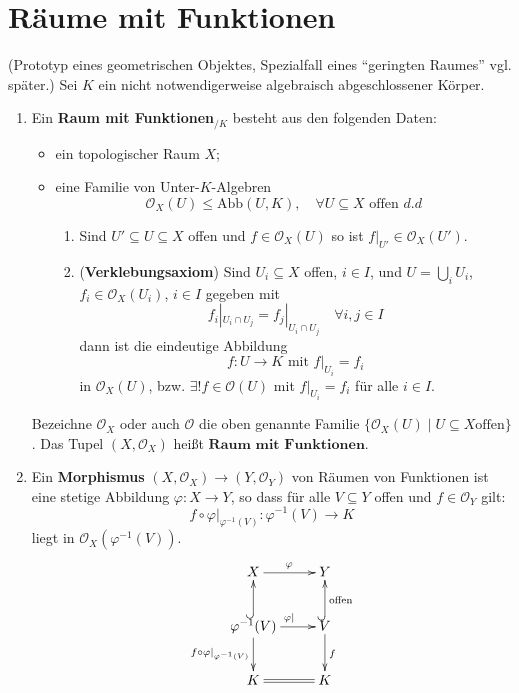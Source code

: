 
\section{Räume mit Funktionen}
\label{sec:raeume-mit-funktionen}
(Prototyp eines geometrischen Objektes, Spezialfall eines ``geringten
Raumes'' vgl. später.) Sei $K$ ein nicht notwendigerweise algebraisch abgeschlossener
Körper.
\begin{defn}
  \label{def:raum-mit-funktionen}
  \mbox{}
  \begin{enumerate}
  \item Ein \textbf{Raum mit Funktionen}$_{/K}$ besteht
    aus den folgenden Daten:
    \begin{itemize}
    \item ein topologischer Raum $X$;
    \item eine Familie von Unter-$K$-Algebren
      \[
        \mathcal{O}_X(U)\leq\text{Abb}(U,K),\quad\forall U\subseteq X\text{ offen }d.d
      \]

      \begin{enumerate}
      \item Sind $U'\subseteq U\subseteq X$ offen und $f\in\mathcal{O}_X(U)$ so ist
        $f|_{U'}\in \mathcal{O}_X(U')$.
      \item (\textbf{Verklebungsaxiom}) Sind $U_{i}\subseteq X$
        offen, $i\in I$, und $U=\bigcup_{i}U_{i}$, $f_{i}\in\mathcal{O}_X(U_{i})$,
        $i\in I$ gegeben mit
        \[
          f_{i}|_{U_{i}\cap U_{j}}=f_{j}|_{U_{i}\cap U_{j}}\quad\forall i,j\in I
        \]
        dann ist die eindeutige Abbildung
        \[
          f:U\rightarrow K\text{ mit }f|_{U_{i}}=f_{i}
        \]
        in $\mathcal{O}_X(U)$, bzw. $\exists!f\in\mathcal{O}(U)$ mit $f|_{U_{i}}=f_{i}$ für alle $i \in I$.
      \end{enumerate}
    \end{itemize}
    Bezeichne $\mathcal{O}_X$ oder auch $\mathcal{O}$ die oben genannte
    Familie $\{\mathcal{O}_X(U) \mid U \subseteq X \text{offen}\}$. Das Tupel $(X,\mathcal{O}_{X})$ heißt $\textbf{Raum mit Funktionen}$.
  \item Ein \textbf{Morphismus} $(X,\mathcal{O}_{X})\rightarrow(Y,\mathcal{O}_{Y})$
    von Räumen von Funktionen ist eine stetige Abbildung $\varphi:X\rightarrow Y$,
    so dass für alle $V\subseteq Y$ offen und $f\in\mathcal{O}_{Y}$
    gilt:
    \[
      f\circ \varphi|_{\varphi^{-1}(V)}:\varphi^{-1}(V)\rightarrow K
    \]
    liegt in $\mathcal{O}_{X}(\varphi^{-1}(V))$.
    \[
      \xymatrix{X\ar[r]^{\varphi} & Y\\
        \varphi^{-1}(V)\ar[r]^{\varphi|}\ar[d]_{f\circ \varphi|_{\varphi^{-1}(V)}}\ar@{^{(}->}[u] & V\ar[d]^{f}\ar@{^{(}->}[u]_{\text{offen}}\\
        K\ar@{=}[r] & K
      }
    \]
  \end{enumerate}
\end{defn}
